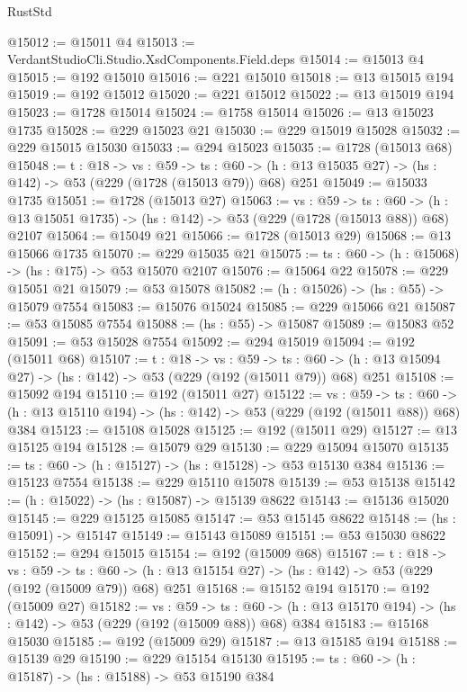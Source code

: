 \begin{lexlean}{RustStd}
\begin{coremodule}
@15012 := @15011 @4
@15013 := VerdantStudioCli.Studio.XsdComponents.Field.deps
@15014 := @15013 @4
@15015 := @192 @15010
@15016 := @221 @15010
@15018 := @13 @15015 @194
@15019 := @192 @15012
@15020 := @221 @15012
@15022 := @13 @15019 @194
@15023 := @1728 @15014
@15024 := @1758 @15014
@15026 := @13 @15023 @1735
@15028 := @229 @15023 @21
@15030 := @229 @15019 @15028
@15032 := @229 @15015 @15030
@15033 := @294 @15023
@15035 := @1728 (@15013 @68)
@15048 := {t : @18} ->
  {vs : @59} ->
  {ts : @60} -> (h : @13 @15035 @27) -> (hs : @142) -> @53 (@229 (@1728 (@15013 @79)) @68) @251
@15049 := @15033 @1735
@15051 := @1728 (@15013 @27)
@15063 := {vs : @59} ->
  {ts : @60} -> (h : @13 @15051 @1735) -> (hs : @142) -> @53 (@229 (@1728 (@15013 @88)) @68) @2107
@15064 := @15049 @21
@15066 := @1728 (@15013 @29)
@15068 := @13 @15066 @1735
@15070 := @229 @15035 @21
@15075 := {ts : @60} -> (h : @15068) -> (hs : @175) -> @53 @15070 @2107
@15076 := @15064 @22
@15078 := @229 @15051 @21
@15079 := @53 @15078
@15082 := (h : @15026) -> (hs : @55) -> @15079 @7554
@15083 := @15076 @15024
@15085 := @229 @15066 @21
@15087 := @53 @15085 @7554
@15088 := (hs : @55) -> @15087
@15089 := @15083 @52
@15091 := @53 @15028 @7554
@15092 := @294 @15019
@15094 := @192 (@15011 @68)
@15107 := {t : @18} ->
  {vs : @59} ->
  {ts : @60} -> (h : @13 @15094 @27) -> (hs : @142) -> @53 (@229 (@192 (@15011 @79)) @68) @251
@15108 := @15092 @194
@15110 := @192 (@15011 @27)
@15122 := {vs : @59} ->
  {ts : @60} -> (h : @13 @15110 @194) -> (hs : @142) -> @53 (@229 (@192 (@15011 @88)) @68) @384
@15123 := @15108 @15028
@15125 := @192 (@15011 @29)
@15127 := @13 @15125 @194
@15128 := @15079 @29
@15130 := @229 @15094 @15070
@15135 := {ts : @60} -> (h : @15127) -> (hs : @15128) -> @53 @15130 @384
@15136 := @15123 @7554
@15138 := @229 @15110 @15078
@15139 := @53 @15138
@15142 := (h : @15022) -> (hs : @15087) -> @15139 @8622
@15143 := @15136 @15020
@15145 := @229 @15125 @15085
@15147 := @53 @15145 @8622
@15148 := (hs : @15091) -> @15147
@15149 := @15143 @15089
@15151 := @53 @15030 @8622
@15152 := @294 @15015
@15154 := @192 (@15009 @68)
@15167 := {t : @18} ->
  {vs : @59} ->
  {ts : @60} -> (h : @13 @15154 @27) -> (hs : @142) -> @53 (@229 (@192 (@15009 @79)) @68) @251
@15168 := @15152 @194
@15170 := @192 (@15009 @27)
@15182 := {vs : @59} ->
  {ts : @60} -> (h : @13 @15170 @194) -> (hs : @142) -> @53 (@229 (@192 (@15009 @88)) @68) @384
@15183 := @15168 @15030
@15185 := @192 (@15009 @29)
@15187 := @13 @15185 @194
@15188 := @15139 @29
@15190 := @229 @15154 @15130
@15195 := {ts : @60} -> (h : @15187) -> (hs : @15188) -> @53 @15190 @384

\end{coremodule}
\end{lexlean}
